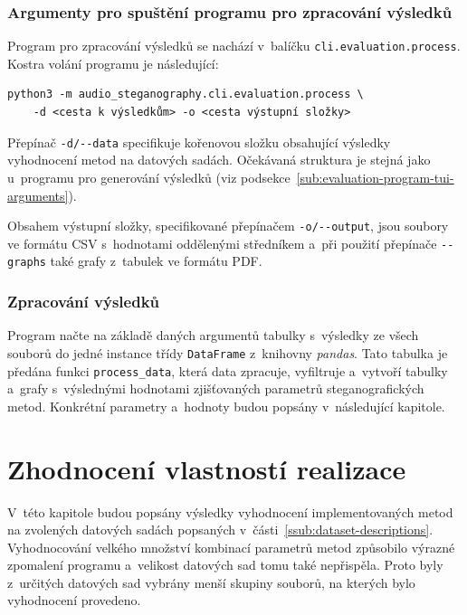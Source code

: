 \subsection*{Argumenty pro spuštění programu pro zpracování výsledků}
\label{sub:evaluation-processing-program-tui-arguments}

Program pro zpracování výsledků se nachází v~balíčku
\texttt{cli.evaluation.process}. Kostra volání programu je následující:

\begin{verbatim}
python3 -m audio_steganography.cli.evaluation.process \
    -d <cesta k výsledkům> -o <cesta výstupní složky>
\end{verbatim}

\noindent Přepínač \verb|-d/--data| specifikuje kořenovou složku obsahující
výsledky vyhodnocení metod na datových sadách. Očekávaná struktura je stejná
jako u~programu pro generování výsledků
(viz podsekce~\ref{sub:evaluation-program-tui-arguments}).

Obsahem výstupní složky, specifikované přepínačem \verb|-o/--output|, jsou
soubory ve formátu CSV s~hodnotami oddělenými středníkem a~při použití
přepínače \verb|--graphs| také grafy z~tabulek ve formátu PDF.

\subsection*{Zpracování výsledků}
\label{sub:evaluation-processing-program}

Program načte na základě daných argumentů tabulky s~výsledky ze všech souborů
do jedné instance třídy \texttt{DataFrame} z~knihovny \textit{pandas}. Tato
tabulka je předána funkci \texttt{process\_data}, která data zpracuje,
vyfiltruje a~vytvoří tabulky a~grafy s~výslednými hodnotami zjišťovaných
parametrů steganografických metod. Konkrétní parametry a~hodnoty budou popsány
v~následující kapitole.


\chapter{Zhodnocení vlastností realizace}
\label{cha:method-evaluation}

V~této kapitole budou popsány výsledky vyhodnocení implementovaných metod na
zvolených datových sadách popsaných v~části~\ref{ssub:dataset-descriptions}.
Vyhodnocování velkého množství kombinací parametrů metod způsobilo výrazné
zpomalení programu a~velikost datových sad tomu také nepřispěla. Proto byly
z~určitých datových sad vybrány menší skupiny souborů, na kterých bylo
vyhodnocení provedeno.

